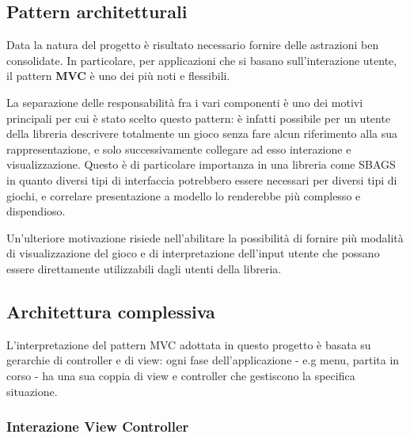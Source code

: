 \subsection{Pattern architetturali}
Data la natura del progetto è risultato necessario fornire delle astrazioni ben consolidate.
%
In particolare, per applicazioni che si basano sull'interazione utente, il pattern  \textbf{MVC} è uno dei più noti e flessibili.

La separazione delle responsabilità fra i vari componenti è uno dei motivi principali per cui è stato scelto questo pattern: è infatti possibile per un utente della libreria descrivere totalmente un gioco senza fare alcun riferimento alla sua rappresentazione, e solo successivamente collegare ad esso interazione e visualizzazione.
%
Questo è di particolare importanza in una libreria come SBAGS in quanto diversi tipi di interfaccia potrebbero essere necessari per diversi tipi di giochi, e correlare presentazione a modello lo renderebbe più complesso e dispendioso.

Un'ulteriore motivazione risiede nell'abilitare la possibilità di fornire più modalità di visualizzazione del gioco e di interpretazione dell'input utente che possano essere direttamente utilizzabili dagli utenti della libreria. 

\subsection{Architettura complessiva}
L'interpretazione del pattern MVC adottata in questo progetto è basata su gerarchie di controller e di view: ogni fase dell'applicazione - e.g menu, partita in corso - ha una sua coppia di view e controller che gestiscono la specifica situazione.

\subsubsection{}

\subsubsection{Interazione View Controller}

